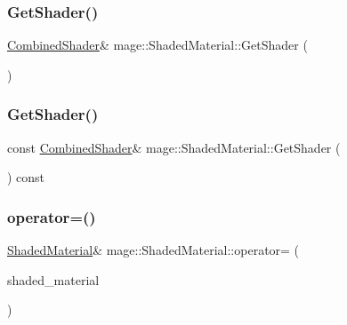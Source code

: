 \hypertarget{structmage_1_1_shaded_material_a1138a96b289a841920f39553ebb230d1}{}\label{structmage_1_1_shaded_material_a1138a96b289a841920f39553ebb230d1} 
\subsubsection{\texorpdfstring{Get\+Shader()}{GetShader()}\hspace{0.1cm}{\footnotesize\ttfamily [1/2]}}
{\footnotesize\ttfamily \hyperlink{structmage_1_1_combined_shader}{Combined\+Shader}\& mage\+::\+Shaded\+Material\+::\+Get\+Shader (\begin{DoxyParamCaption}{ }\end{DoxyParamCaption})}

\hypertarget{structmage_1_1_shaded_material_ac03da6f1dfd81fc19da5a8f8214662ee}{}\label{structmage_1_1_shaded_material_ac03da6f1dfd81fc19da5a8f8214662ee} 
\subsubsection{\texorpdfstring{Get\+Shader()}{GetShader()}\hspace{0.1cm}{\footnotesize\ttfamily [2/2]}}
{\footnotesize\ttfamily const \hyperlink{structmage_1_1_combined_shader}{Combined\+Shader}\& mage\+::\+Shaded\+Material\+::\+Get\+Shader (\begin{DoxyParamCaption}{ }\end{DoxyParamCaption}) const}

\hypertarget{structmage_1_1_shaded_material_ade9ec3ee6aae198e695240a5b89a0d72}{}\label{structmage_1_1_shaded_material_ade9ec3ee6aae198e695240a5b89a0d72} 
\subsubsection{\texorpdfstring{operator=()}{operator=()}\hspace{0.1cm}{\footnotesize\ttfamily [1/2]}}
{\footnotesize\ttfamily \hyperlink{structmage_1_1_shaded_material}{Shaded\+Material}\& mage\+::\+Shaded\+Material\+::operator= (\begin{DoxyParamCaption}\item[{const \hyperlink{structmage_1_1_shaded_material}{Shaded\+Material} \&}]{shaded\+\_\+material }\end{DoxyParamCaption})\hspace{0.3cm}{\ttfamily [default]}}

